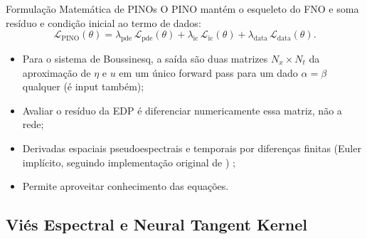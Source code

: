 \begin{frame}{Formulação Matemática de PINOs}
  O PINO \parencite{li2023pino} mantém o esqueleto do FNO e soma resíduo e condição
  inicial ao termo de dados:
  \begin{equation*}
    \mathcal{L}_{\text{PINO}}(\theta)
      = \lambda_{\text{pde}}\,\mathcal{L}_{\text{pde}}(\theta)
      + \lambda_{\text{ic}}\,\mathcal{L}_{\text{ic}}(\theta)
      + \lambda_{\text{data}}\,\mathcal{L}_{\text{data}}(\theta).
  \end{equation*}
  \begin{itemize}[<+->]
    \item Para o sistema de Boussinesq, a saída são duas matrizes $N_x \times N_t$ da aproximação de $\eta$ e $u$ em um único forward pass para um dado $\alpha=\beta$ qualquer (é input também);
    
    \item Avaliar o resíduo da EDP é diferenciar numericamente essa matriz, não a rede;
  
    \item Derivadas espaciais pseudoespectrais e temporais por diferenças finitas (Euler implícito, seguindo implementação original de \textcite{li2023pino}) \parencite{li2023pino_code};
    
    \item Permite aproveitar conhecimento das equações.
  \end{itemize}
\end{frame}

\subsection{Viés Espectral e Neural Tangent Kernel}

